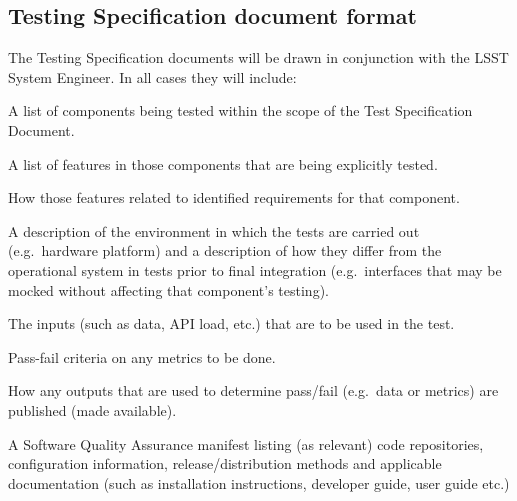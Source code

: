 \subsection{Testing Specification document format}\label{sect:tsform}

The Testing Specification documents will be drawn in conjunction with the LSST System Engineer. In all cases they will include:

\begin{itemize_single}

\item A list of components being tested within the scope of the Test Specification Document. 

\item A list of features in those components that are being explicitly tested.

\item How those features related to identified requirements for that component.
  
\item A description of the environment in which the tests are carried out (e.g.\ hardware platform) and a description of how they differ from the operational system in tests prior to final integration (e.g.\ interfaces that may be mocked without affecting that component's testing). 
  
\item The inputs (such as data, API load, etc.) that are to be used in the test.

\item Pass-fail criteria on any metrics to be done.

\item How any outputs that are used to determine pass/fail (e.g.\ data or metrics) are published (made available). 

\item A Software Quality Assurance manifest listing (as relevant) code repositories, configuration information, release/distribution methods and applicable documentation (such as installation instructions, developer guide, user guide etc.)
  
\end{itemize_single}


